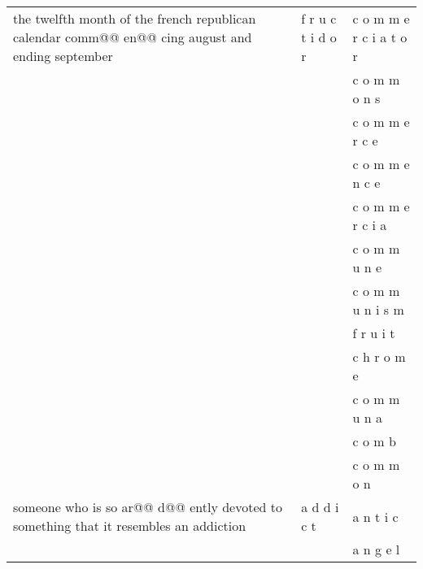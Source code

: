 \documentclass[11pt]{article}
\begin{document}
\begin{spacing}{1}
\begin{table}[!htbp]
\begin{tabular}{p{8cm} l l}
the twelfth month of the french republican calendar comm@@ en@@ cing august and ending september & f r u c t i d o r & c o m m e r c i a t o r \\
                                                                                                 &                   & c o m m o n s           \\
                                                                                                 &                   & c o m m e r c e         \\
                                                                                                 &                   & c o m m e n c e         \\
                                                                                                 &                   & c o m m e r c i a       \\
                                                                                                 &                   & c o m m u n e           \\
                                                                                                 &                   & c o m m u n i s m       \\
                                                                                                 &                   & f r u i t               \\
                                                                                                 &                   & c h r o m e             \\
                                                                                                 &                   & c o m m u n a           \\
                                                                                                 &                   & c o m b                 \\
                                                                                                 &                   & c o m m o n             \\
someone who is so ar@@ d@@ ently devoted to something that it resembles an addiction             & a d d i c t       & a n t i c               \\
                                                                                                 &                   & a n g e l               \\

\end{tabular}
\end{table}
\end{spacing}
\end{document}
